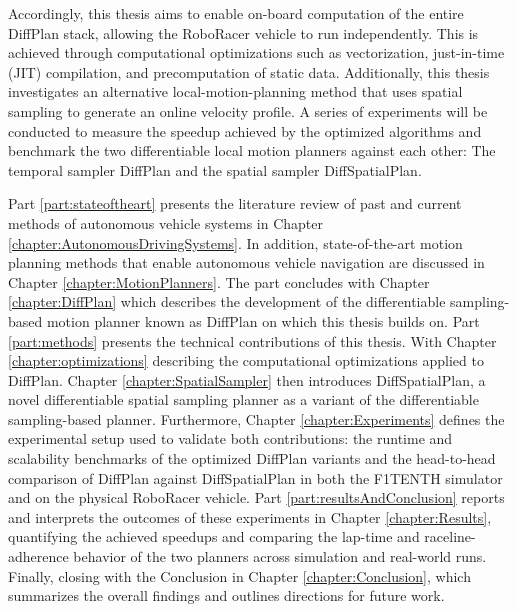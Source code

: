 Accordingly, this thesis aims to enable on-board computation of the entire DiffPlan stack, allowing the RoboRacer vehicle to run independently.
This is achieved through computational optimizations such as vectorization, just-in-time (JIT) compilation, and precomputation of static data.
Additionally, this thesis investigates an alternative local-motion-planning method that uses spatial sampling to generate an online velocity profile.
A series of experiments will be conducted to measure the speedup achieved by the optimized algorithms and benchmark the two differentiable local motion planners against each other: The temporal sampler DiffPlan and the spatial sampler DiffSpatialPlan.

\newpage
Part \ref{part:stateoftheart} presents the literature review of past and current methods of autonomous vehicle systems in Chapter \ref{chapter:AutonomousDrivingSystems}.
In addition, state-of-the-art motion planning methods that enable autonomous vehicle navigation are discussed in Chapter \ref{chapter:MotionPlanners}.
The part concludes with Chapter \ref{chapter:DiffPlan} which describes the development of the differentiable sampling-based motion planner known as DiffPlan on which this thesis builds on.
Part \ref{part:methods} presents the technical contributions of this thesis.
With Chapter \ref{chapter:optimizations} describing the computational optimizations applied to DiffPlan.
Chapter \ref{chapter:SpatialSampler} then introduces DiffSpatialPlan, a novel differentiable spatial sampling planner as a variant of the differentiable sampling-based planner.
Furthermore, Chapter \ref{chapter:Experiments} defines the experimental setup used to validate both contributions: the runtime and scalability benchmarks of the optimized DiffPlan variants and the head-to-head comparison of DiffPlan against DiffSpatialPlan in both the F1TENTH simulator and on the physical RoboRacer vehicle.
Part \ref{part:resultsAndConclusion} reports and interprets the outcomes of these experiments in Chapter \ref{chapter:Results}, quantifying the achieved speedups and comparing the lap-time and raceline-adherence behavior of the two planners across simulation and real-world runs.
Finally, closing with the Conclusion in Chapter \ref{chapter:Conclusion}, which summarizes the overall findings and outlines directions for future work.
